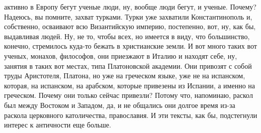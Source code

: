 активно в Европу бегут ученые люди, ну, вообще люди бегут, и ученые. Почему?
Надеюсь, вы помните, захват турками. Турки уже захватили Константинополь и,
собственно, осваивают всю Византийскую империю, постепенно, вот, ну, как бы,
выдавливая людей. Ну, не то, чтобы всех, но имеется в виду, что большинство,
конечно, стремилось куда-то бежать в христианские земли. И вот много таких вот
ученых, монахов, философов, они приезжают в Италию и находят себе, ну, занятия в
таких вот местах, типа Платоновской академии. Они привозят с собой труды
Аристотеля, Платона, но уже на греческом языке, уже не на испанском, которая, на
испанском, на арабском, которые привезены из Испании, а именно на греческом.
Почему они только сейчас привезли? Потому что, напоминаю, раскол был между
Востоком и Западом, да, и не общались они долгое время из-за раскола церковного
католичества, православия. И эти тексты, как бы, подстегнули интерес к
античности еще больше. 

